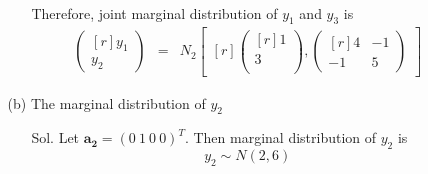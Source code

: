 \documentclass[12pt]{article} %
\begin{document}
\begin{enumerate}
\begin{enumerate}
\begin{enumerate}
\begin{eqnarray*}
				\end{eqnarray*}
				Therefore, joint marginal distribution of $y_{1}$ and $y_{3}$ is
				\begin{eqnarray*}
				\begin{pmatrix}[r]
					y_{1} \\
					y_{2}
				\end{pmatrix}&=&
					N_{2}\begin{bmatrix}[r]
						\begin{pmatrix}[r]
							1 \\
							3 \\							
						\end{pmatrix}, 
						\begin{pmatrix}[r]
						 4 & -1 \\
					    -1 & 5						
						\end{pmatrix}
					\end{bmatrix}
				\end{eqnarray*}
			\end{enumerate}
			
		\item[(b)] The marginal distribution of $y_{2}$
			\begin{enumerate}
				\item[Sol.] Let $\mathbf{a_{2}}=(0~1~0~0)^{T}$. 
				Then marginal distribution of $y_{2}$ is
				\begin{equation*}
					y_{2} \sim N(2, 6)
				\end{equation*}
			\end{enumerate}
			

\end{enumerate}
\end{enumerate}
\end{document}
